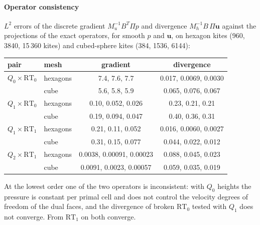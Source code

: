 \documentclass[preprint,12pt]{elsarticle}
\newcommand{\bu}{\mathbf{u}}
\theoremstyle{definition}
\begin{document}
\paragraph{Operator consistency} $L^2$ errors of the discrete gradient $M_u^{-1}B^T\Pi p$ and divergence
$M_h^{-1}B\,\Pi\bu$ against the projections of the exact operators, for smooth $p$ and $\bu$, on hexagon
kites (960, 3840, 15\,360 kites) and cubed-sphere kites (384, 1536, 6144):
\begin{center}\small
\begin{tabular}{llcc}
\toprule
pair & mesh & gradient & divergence \\
\midrule
$Q_0\times\mathrm{RT}_0$ & hexagons  & 7.4, 7.6, 7.7 & 0.017, 0.0069, 0.0030 \\
                         & cube & 5.6, 5.8, 5.9 & 0.065, 0.076, 0.067 \\
$Q_1\times\mathrm{RT}_0$ & hexagons  & 0.10, 0.052, 0.026 & 0.23, 0.21, 0.21 \\
                         & cube & 0.19, 0.094, 0.047 & 0.40, 0.36, 0.31 \\
$Q_1\times\mathrm{RT}_1$ & hexagons  & 0.21, 0.11, 0.052 & 0.016, 0.0060, 0.0027 \\
                         & cube & 0.31, 0.15, 0.077 & 0.044, 0.022, 0.012 \\
$Q_2\times\mathrm{RT}_1$ & hexagons  & 0.0038, 0.00091, 0.00023 & 0.088, 0.045, 0.023 \\
                         & cube & 0.0091, 0.0023, 0.00057 & 0.059, 0.035, 0.019 \\
\bottomrule
\end{tabular}
\end{center}
At the lowest order one of the two operators is inconsistent: with $Q_0$ heights the pressure is constant
per primal cell and does not control the velocity degrees of freedom of the dual faces, and the divergence
of broken $\mathrm{RT}_0$ tested with $Q_1$ does not converge. From $\mathrm{RT}_1$ on both converge.
\end{document}
